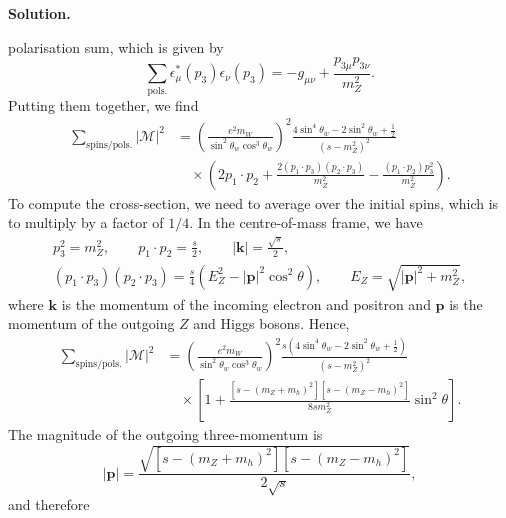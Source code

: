 \documentclass[a4paper,11pt]{article}
\newenvironment{solution}{\par\medskip\noindent\textbf{Solution.}\par\smallskip}{\par\medskip}
\begin{document}
\begin{solution}
polarisation sum, which is given by
\begin{equation}
    \sum_{\mathrm{pols.}}\epsilon_\mu^*(p_3)\epsilon_\nu(p_3)
    = -g_{\mu\nu}+ \frac{p_{3\mu}p_{3\nu}}{m_Z^2}.
\end{equation}
Putting them together, we find
\begin{equation}
\begin{aligned}
    \sum_{\mathrm{spins/pols.}}|\mathcal{M}|^2
    &= \left(\frac{e^2m_W}{\sin^2\theta_w\cos^3\theta_w}\right)^2
    \frac{4\sin^4\theta_w-2\sin^2\theta_w+\frac{1}{2}}
    {(s-m_Z^2)^2}\\
    &\quad\times\left(2p_1\cdot p_2
    + \frac{2(p_1\cdot p_3)(p_2\cdot p_3)}{m_Z^2}
    - \frac{(p_1\cdot p_2)p_3^2}{m_Z^2}\right).
\end{aligned}
\end{equation}
To compute the cross-section, we need to average over the initial spins, which
is to multiply by a factor of $1/4$. In the centre-of-mass frame, we have
\begin{equation}
\begin{gathered}
    p_3^2=m_Z^2,\qquad p_1\cdot p_2=\frac{s}{2},\qquad
    |\mathbf{k}|=\frac{\sqrt{s}}{2},\\
    (p_1\cdot p_3)(p_2\cdot p_3)
    =\frac{s}{4}\left(E_Z^2-|\mathbf{p}|^2\cos^2\theta\right),
    \qquad E_Z=\sqrt{|\mathbf{p}|^2+m_Z^2},
\end{gathered}
\end{equation}
where $\mathbf{k}$ is the momentum of the incoming electron and positron and
$\mathbf{p}$ is the momentum of the outgoing $Z$ and Higgs bosons. Hence,
\begin{equation}
\begin{aligned}
    \sum_{\mathrm{spins/pols.}}|\mathcal{M}|^2
    &=\left(\frac{e^2m_W}{\sin^2\theta_w\cos^3\theta_w}\right)^2
    \frac{s\left(4\sin^4\theta_w-2\sin^2\theta_w+\frac{1}{2}\right)}
    {(s-m_Z^2)^2}\\
    &\quad\times\left[1+
    \frac{\left[s-(m_Z+m_h)^2\right]\left[s-(m_Z-m_h)^2\right]}
    {8sm_Z^2}\sin^2\theta\right].
\end{aligned}
\end{equation}
The magnitude of the outgoing three-momentum is
\begin{equation}
    |\mathbf{p}|=
    \frac{\sqrt{\left[s-(m_Z+m_h)^2\right]
    \left[s-(m_Z-m_h)^2\right]}}{2\sqrt{s}},
\end{equation}
and therefore
\begin{equation}

\end{equation}
\end{solution}
\end{document}
